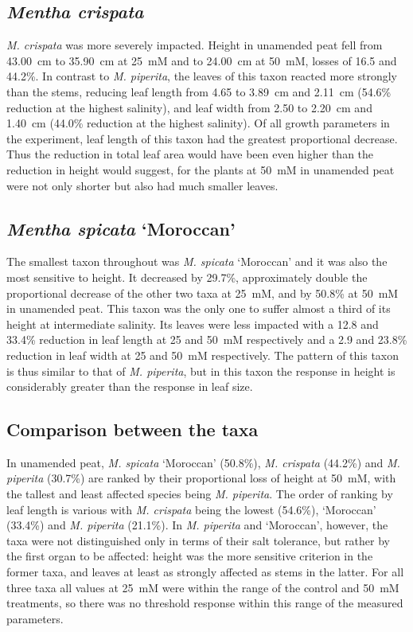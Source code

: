 \subsection{\textit{Mentha crispata}}

\textit{M. crispata} was more severely impacted. Height in unamended peat fell from 43.00~cm to 35.90~cm at 25~mM and to 24.00~cm at 50~mM, losses of 16.5 and 44.2\%. In contrast to \textit{M. piperita}, the leaves of this taxon reacted more strongly than the stems, reducing leaf length from 4.65 to 3.89~cm and 2.11~cm (54.6\% reduction at the highest salinity), and leaf width from 2.50 to 2.20~cm and 1.40~cm (44.0\% reduction at the highest salinity). Of all growth parameters in the experiment, leaf length of this taxon had the greatest proportional decrease. Thus the reduction in total leaf area would have been even higher than the reduction in height would suggest, for the plants at 50~mM in unamended peat were not only shorter but also had much smaller leaves.

\subsection{\textit{Mentha spicata} `Moroccan'}

The smallest taxon throughout was \textit{M. spicata} `Moroccan' and it was also the most sensitive to height. It decreased by 29.7\%, approximately double the proportional decrease of the other two taxa at 25~mM, and by 50.8\% at 50~mM in unamended peat. This taxon was the only one to suffer almost a third of its height at intermediate salinity. Its leaves were less impacted with a 12.8 and 33.4\% reduction in leaf length at 25 and 50~mM respectively and a 2.9 and 23.8\% reduction in leaf width at 25 and 50~mM respectively. The pattern of this taxon is thus similar to that of \textit{M. piperita}, but in this taxon the response in height is considerably greater than the response in leaf size.

\subsection{Comparison between the taxa}

In unamended peat, \textit{M. spicata} `Moroccan' (50.8\%), \textit{M. crispata} (44.2\%) and \textit{M. piperita} (30.7\%) are ranked by their proportional loss of height at 50~mM, with the tallest and least affected species being \textit{M. piperita}. The order of ranking by leaf length is various with \textit{M. crispata} being the lowest (54.6\%), `Moroccan' (33.4\%) and \textit{M. piperita} (21.1\%). In \textit{M. piperita} and `Moroccan', however, the taxa were not distinguished only in terms of their salt tolerance, but rather by the first organ to be affected: height was the more sensitive criterion in the former taxa, and leaves at least as strongly affected as stems in the latter. For all three taxa all values at 25~mM were within the range of the control and 50~mM treatments, so there was no threshold response within this range of the measured parameters.

